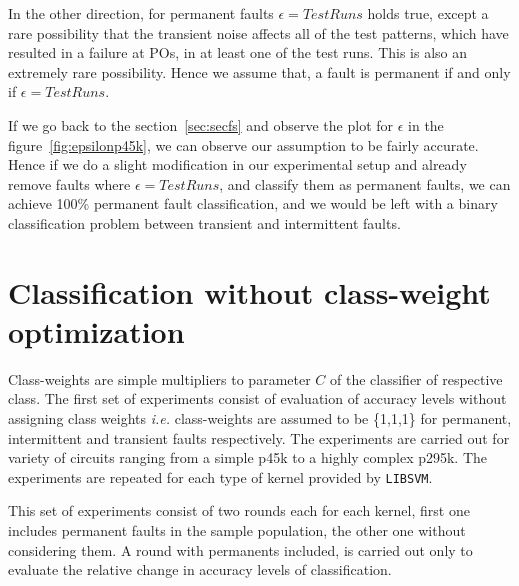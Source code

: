 In the other direction, for permanent faults $\epsilon = Test Runs$ holds true, except a rare possibility that the transient noise affects all of the test patterns, which have resulted in a failure at POs, in at least one of the test runs. This is also an extremely rare possibility. Hence we assume that, a fault is permanent if and only if $\epsilon = Test Runs$.

If we go back to the section~\ref{sec:secfs} and observe the plot for $\epsilon$ in the figure~\ref{fig:epsilonp45k}, we can observe our assumption to be fairly accurate. Hence if we do a slight modification in our experimental setup and already remove faults where $\epsilon = Test Runs$, and classify them as permanent faults, we can achieve 100\% permanent fault classification, and we would be left with a binary classification problem between transient and intermittent faults. 

\section{Classification without class-weight optimization}
Class-weights are simple multipliers to parameter $C$ of the classifier of respective class. The first set of experiments consist of evaluation of accuracy levels without assigning class weights \emph{i.e.} class-weights are assumed to be \{1,1,1\} for permanent, intermittent and transient faults respectively. The experiments are carried out for variety of circuits ranging from a simple p45k to a highly complex p295k. The experiments are repeated for each type of kernel provided by \texttt{LIBSVM}. 

This set of experiments consist of two rounds each for each kernel, first one includes permanent faults in the sample population, the other one without considering them. A round with permanents included, is carried out only to evaluate the relative change in accuracy levels of classification.


